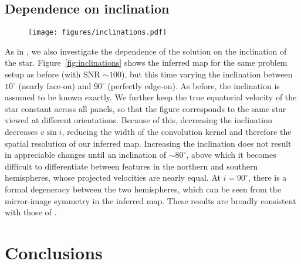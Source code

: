 \documentclass[modern]{aastex62}
\begin{document}
\subsection{Dependence on inclination}
\label{sec:inc}
%
\begin{figure}[p!]
    \begin{centering}
    \texttt{[image: figures/inclinations.pdf]}
    \end{centering}
\end{figure}
As in \citet{Vogt1987},
we also investigate the dependence of the solution on the inclination
of the star.
Figure~\ref{fig:inclinations} shows the inferred map for the same problem
setup as before (with SNR $\sim 100$), but this time varying the
inclination between $10^\circ$ (nearly face-on) and $90^\circ$ (perfectly
edge-on). As before, the inclination is assumed to be known exactly. We
further keep the true equatorial velocity of the star constant across
all panels, so that the figure corresponds to the same star viewed at
different orientations. Because of this, decreasing the inclination
decreases $v\sin i$, reducing the width of the convolution kernel and
therefore the spatial resolution of our inferred map. Increasing the
inclination does not result in appreciable changes until an inclination of
$\sim 80^\circ$, above which it becomes difficult to differentiate between
features in the northern and southern hemispheres, whose projected
velocities are nearly equal. At $i = 90^\circ$, there is a formal
degeneracy between the two hemispheres, which can be seen from the
mirror-image symmetry in the inferred map. These results are broadly consistent
with those of \citet{Vogt1987}.

\section{Conclusions}
\label{sec:conclusions}
\end{document}
